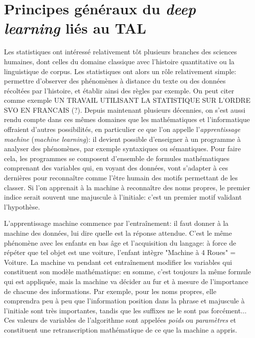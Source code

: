 \chapter{Principes généraux du \textit{deep learning} liés au TAL}

Les statistiques ont intéressé relativement tôt plusieurs branches des sciences humaines, dont celles du domaine classique avec l'histoire quantitative ou la linguistique de corpus. Les statistiques ont alors un rôle relativement simple: permettre d'observer des phénomènes à distance du texte ou des données récoltées par l'histoire, et établir ainsi des règles par exemple. On peut citer comme exemple UN TRAVAIL UTILISANT LA STATISTIQUE SUR L'ORDRE SVO EN FRANCAIS (?). Depuis maintenant plusieurs décennies, on s'est aussi rendu compte dans ces mêmes domaines que les mathématiques et l'informatique offraient d'autres possibilités, en particulier ce que l'on appelle l'\textit{apprentissage machine} (\textit{machine learning}): il devient possible d'enseigner à un programme à analyser des phénomènes, par exemple syntaxiques ou sémantiques. Pour faire cela, les programmes se composent d'ensemble de formules mathématiques comprenant des variables qui, en voyant des données, vont s'adapter à ces dernières pour reconnaître comme l'être humain des motifs permettant de les classer. Si l'on apprenait à la machine à reconnaître des noms propres, le premier indice serait souvent une majuscule à l'initiale: c'est un premier motif validant l'hypothèse.

L'apprentissage machine commence par l'entraînement: il faut donner à la machine des données, lui dire quelle est la réponse attendue. C'est le même phénomène avec les enfants en bas âge et l'acquisition du langage: à force de répéter que tel objet est une voiture, l'enfant intègre "Machine à 4 Roues" = Voiture. La machine va pendant cet entraînement modifier les variables qui constituent son modèle mathématique: en somme, c'est toujours la même formule qui est appliquée, mais la machine va décider au fur et à mesure de l'importance de chacune des informations. Par exemple, pour les noms propres, elle comprendra peu à peu que l'information position dans la phrase et majuscule à l'initiale sont très importantes, tandis que les suffixes ne le sont pas forcément... Ces valeurs de variables de l'algorithme sont appelées \textit{poids} ou \textit{paramètres} et constituent une retranscription mathématique de ce que la machine a appris. 

